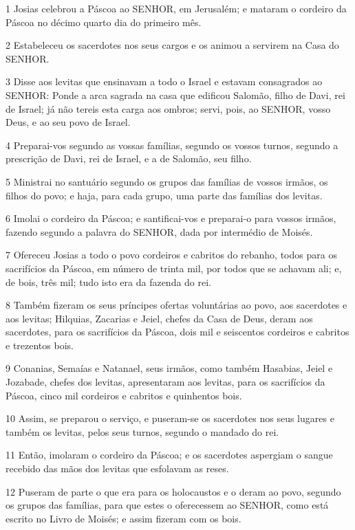 \par 1 Josias celebrou a Páscoa ao SENHOR, em Jerusalém; e mataram o cordeiro da Páscoa no décimo quarto dia do primeiro mês.
\par 2 Estabeleceu os sacerdotes nos seus cargos e os animou a servirem na Casa do SENHOR.
\par 3 Disse aos levitas que ensinavam a todo o Israel e estavam consagrados ao SENHOR: Ponde a arca sagrada na casa que edificou Salomão, filho de Davi, rei de Israel; já não tereis esta carga aos ombros; servi, pois, ao SENHOR, vosso Deus, e ao seu povo de Israel.
\par 4 Preparai-vos segundo as vossas famílias, segundo os vossos turnos, segundo a prescrição de Davi, rei de Israel, e a de Salomão, seu filho.
\par 5 Ministrai no santuário segundo os grupos das famílias de vossos irmãos, os filhos do povo; e haja, para cada grupo, uma parte das famílias dos levitas.
\par 6 Imolai o cordeiro da Páscoa; e santificai-vos e preparai-o para vossos irmãos, fazendo segundo a palavra do SENHOR, dada por intermédio de Moisés.
\par 7 Ofereceu Josias a todo o povo cordeiros e cabritos do rebanho, todos para os sacrifícios da Páscoa, em número de trinta mil, por todos que se achavam ali; e, de bois, três mil; tudo isto era da fazenda do rei.
\par 8 Também fizeram os seus príncipes ofertas voluntárias ao povo, aos sacerdotes e aos levitas; Hilquias, Zacarias e Jeiel, chefes da Casa de Deus, deram aos sacerdotes, para os sacrifícios da Páscoa, dois mil e seiscentos cordeiros e cabritos e trezentos bois.
\par 9 Conanias, Semaías e Natanael, seus irmãos, como também Hasabias, Jeiel e Jozabade, chefes dos levitas, apresentaram aos levitas, para os sacrifícios da Páscoa, cinco mil cordeiros e cabritos e quinhentos bois.
\par 10 Assim, se preparou o serviço, e puseram-se os sacerdotes nos seus lugares e também os levitas, pelos seus turnos, segundo o mandado do rei.
\par 11 Então, imolaram o cordeiro da Páscoa; e os sacerdotes aspergiam o sangue recebido das mãos dos levitas que esfolavam as reses.
\par 12 Puseram de parte o que era para os holocaustos e o deram ao povo, segundo os grupos das famílias, para que estes o oferecessem ao SENHOR, como está escrito no Livro de Moisés; e assim fizeram com os bois.
